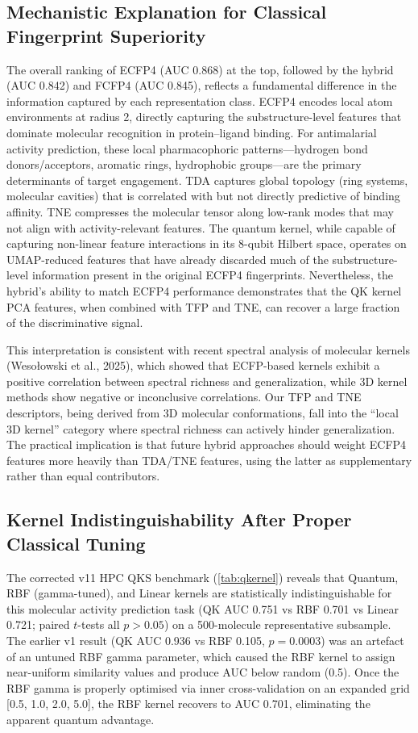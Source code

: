 \documentclass[11pt,a4paper]{article}
\begin{document}
\subsection{Mechanistic Explanation for Classical Fingerprint Superiority}

The overall ranking of ECFP4 (AUC 0.868) at the top, followed by the hybrid (AUC 0.842) and FCFP4 (AUC 0.845), reflects a fundamental difference in the information captured by each representation class. ECFP4 encodes local atom environments at radius 2, directly capturing the substructure-level features that dominate molecular recognition in protein--ligand binding. For antimalarial activity prediction, these local pharmacophoric patterns---hydrogen bond donors/acceptors, aromatic rings, hydrophobic groups---are the primary determinants of target engagement. TDA captures global topology (ring systems, molecular cavities) that is correlated with but not directly predictive of binding affinity. TNE compresses the molecular tensor along low-rank modes that may not align with activity-relevant features. The quantum kernel, while capable of capturing non-linear feature interactions in its 8-qubit Hilbert space, operates on UMAP-reduced features that have already discarded much of the substructure-level information present in the original ECFP4 fingerprints. Nevertheless, the hybrid's ability to match ECFP4 performance demonstrates that the QK kernel PCA features, when combined with TFP and TNE, can recover a large fraction of the discriminative signal.

This interpretation is consistent with recent spectral analysis of molecular kernels (Weso\l{}owski et al., 2025), which showed that ECFP-based kernels exhibit a positive correlation between spectral richness and generalization, while 3D kernel methods show negative or inconclusive correlations. Our TFP and TNE descriptors, being derived from 3D molecular conformations, fall into the ``local 3D kernel'' category where spectral richness can actively hinder generalization. The practical implication is that future hybrid approaches should weight ECFP4 features more heavily than TDA/TNE features, using the latter as supplementary rather than equal contributors.

\subsection{Kernel Indistinguishability After Proper Classical Tuning}

The corrected v11 HPC QKS benchmark (\cref{tab:qkernel}) reveals that Quantum, RBF (gamma-tuned), and Linear kernels are statistically indistinguishable for this molecular activity prediction task (QK AUC 0.751 vs RBF 0.701 vs Linear 0.721; paired $t$-tests all $p > \num{0.05}$) on a 500-molecule representative subsample. The earlier v1 result (QK AUC 0.936 vs RBF 0.105, $p = \num{0.0003}$) was an artefact of an untuned RBF gamma parameter, which caused the RBF kernel to assign near-uniform similarity values and produce AUC below random (0.5). Once the RBF gamma is properly optimised via inner cross-validation on an expanded grid [0.5, 1.0, 2.0, 5.0], the RBF kernel recovers to AUC 0.701, eliminating the apparent quantum advantage.
\end{document}

